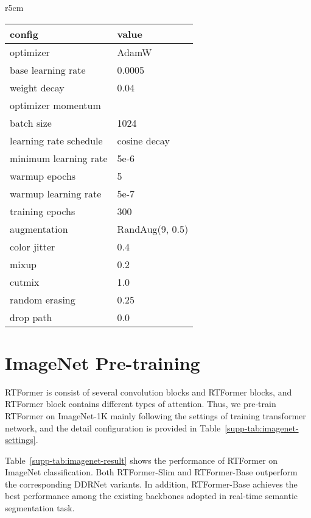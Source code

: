 \documentclass{article}
\begin{document}
{\small


}


\clearpage
\appendix

\begin{wraptable}[18]{r}{5cm}
\caption{Training settings on ImageNet classification.}
\footnotesize
\begin{tabular}{l|l}
\toprule
config & value \\
\hline
optimizer & AdamW \\
base learning rate & 0.0005\\
weight decay & 0.04\\
optimizer momentum &  \\
batch size & 1024 \\
learning rate schedule & cosine decay \\
minimum learning rate & 5e-6 \\
warmup epochs & 5 \\
warmup learning rate & 5e-7 \\
training epochs & 300  \\
augmentation & RandAug(9, 0.5) \\
color jitter & 0.4 \\
mixup & 0.2 \\
cutmix & 1.0 \\
random erasing & 0.25 \\
drop path & 0.0\\
\bottomrule
\end{tabular}
\label{supp-tab:imagenet-settings}
\end{wraptable}

\section{ImageNet Pre-training}

RTFormer is consist of several convolution blocks and RTFormer blocks, and RTFormer block contains different types of attention. Thus, we pre-train RTFormer on ImageNet-1K\cite{deng2009imagenet} mainly following the settings of training transformer network\cite{liu2021swin}, and the detail configuration is provided in Table~\ref{supp-tab:imagenet-settings}.

Table~\ref{supp-tab:imagenet-result} shows the performance of RTFormer on ImageNet classification. Both RTFormer-Slim and RTFormer-Base outperform the corresponding DDRNet variants. In addition, RTFormer-Base achieves the best performance among the existing backbones adopted in real-time semantic segmentation task.
\end{document}
